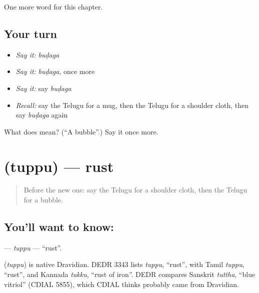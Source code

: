\begin{grammarlens}[title={What you've built}]
One more word for this chapter.
\end{grammarlens}

\subsection*{Your turn}
\begin{itemize}
\raggedright
  \item \emph{Say it:} \emph{buḍaga}
  \item \emph{Say it:} \emph{buḍaga}, once more
  \item \emph{Say it:} say \emph{buḍaga}
  \item \emph{Recall:} say the Telugu for a mug, then the Telugu for a shoulder cloth, then say \emph{buḍaga} again
\end{itemize}

\begin{tcolorbox}[breakable,colback=teal!4,colframe=teal!35!black,title={Before you move on}]
What does  mean? (\textquotedblleft{}A bubble\textquotedblright{}.) Say it once more.
\end{tcolorbox}
\section[\texorpdfstring{\te{తుప్పు} (tuppu)}{తుప్పు (tuppu)}]{ (tuppu) — rust}

\label{lesson:TE-C233-tuppu}



\begin{quote}
Before the new one: say the Telugu for a shoulder cloth, then the Telugu for a bubble.
\end{quote}

\subsection*{You'll want to know: }
\textbf{} — \emph{tuppu} — \textquotedblleft{}rust\textquotedblright{}.

\begin{cousinweb}
\textbf{} (\emph{tuppu}) is native Dravidian. DEDR 3343 lists \emph{tuppu}, \textquotedblleft{}rust\textquotedblright{}, with Tamil \emph{tuppu}, \textquotedblleft{}rust\textquotedblright{}, and Kannada \emph{tukku}, \textquotedblleft{}rust of iron\textquotedblright{}. DEDR compares Sanskrit \emph{tuttha}, \textquotedblleft{}blue vitriol\textquotedblright{} (CDIAL 5855), which CDIAL thinks probably came from Dravidian.
\end{cousinweb}

